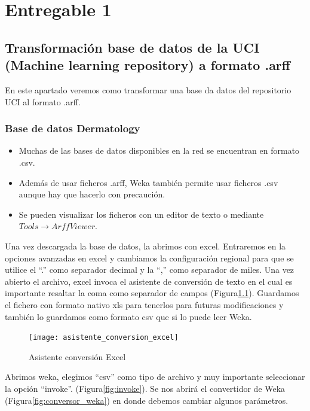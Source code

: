 \chapter{Entregable 1}
\section{Transformación base de datos de la UCI (Machine learning repository) a formato .arff}

En este apartado veremos como transformar una base da datos del repositorio UCI al formato .arff.

\subsection{Base de datos Dermatology}

\begin{itemize}
\item Muchas de las bases de datos disponibles en la red se encuentran en formato .csv.
\item Además de usar ficheros .arff, Weka también permite usar ficheros .csv aunque hay que hacerlo con precaución.
\item Se pueden visualizar los ficheros con un editor de texto o mediante $ Tools \rightarrow ArffViewer $.
\end{itemize}

Una vez descargada la base de datos, la abrimos con excel. Entraremos en la opciones avanzadas en excel y cambiamos la configuración regional para que se utilice el ``.'' como separador decimal y la ``,'' como separador de miles. Una vez abierto el archivo, excel invoca el asistente de conversión de texto en el cual es importante resaltar la coma como separador de campos (Figura\ref{fig:asistente_excel}). Guardamos el fichero con formato nativo xls para tenerlos para futuras modificaciones y también lo guardamos como formato csv que si lo puede leer Weka.

\begin{figure}[H]
	\centering
    \texttt{[image: asistente\_conversion\_excel]}
    \caption{Asistente conversión Excel}
    \label{fig:asistente_excel}
\end{figure}

Abrimos weka, elegimos ``csv'' como tipo de archivo y muy importante seleccionar la opción ``invoke''. (Figura\ref{fig:invoke}).
Se nos abrirá el convertidor de Weka (Figura\ref{fig:conversor_weka}) en donde debemos cambiar algunos parámetros.
 
